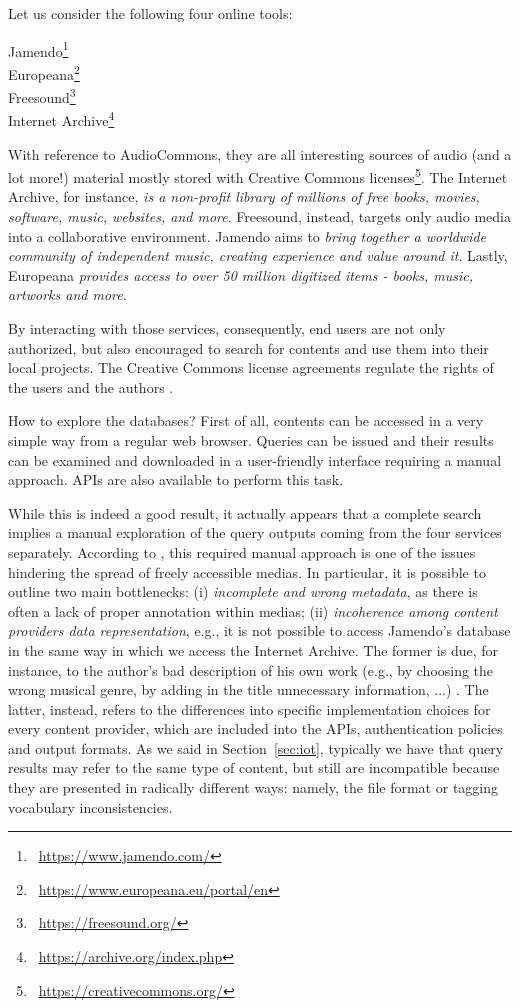 Let us consider the following four online tools:
\begin{multicols}{2}
\begin{center}
Jamendo\footnote{\faLink~\url{https://www.jamendo.com/}} \\
Europeana\footnote{\faLink~\url{https://www.europeana.eu/portal/en}} \\
Freesound\footnote{\faLink~\url{https://freesound.org/}} \\
Internet Archive\footnote{\faLink~\url{https://archive.org/index.php}}
\end{center}
\end{multicols}
With reference to AudioCommons, they are all interesting sources of audio (and a lot more!) material mostly stored with Creative Commons licenses\footnote{\faLink~\url{https://creativecommons.org/}}. The Internet Archive, for instance, \textit{is a non-profit library of millions of free books, movies, software, music, websites, and more}. Freesound, instead, targets only audio media into a collaborative environment. Jamendo aims to \textit{bring together a worldwide community of independent music, creating experience and value around it}. Lastly, Europeana \textit{provides access to over 50 million digitized items - books, music, artworks and more}.

By interacting with those services, consequently, end users are not only authorized, but also encouraged to search for contents and use them into their local projects. The Creative Commons license agreements regulate the rights of the users and the authors \cite{font2016audio}.

How to explore the databases? First of all, contents can be accessed in a very simple way from a regular web browser. Queries can be issued and their results can be examined and downloaded in a user-friendly interface requiring a manual approach. APIs are also available to perform this task.

While this is indeed a good result, it actually appears that a complete search implies a manual exploration of the query outputs coming from the four services separately. According to \cite{font2016audio}, this required manual approach is one of the issues hindering the spread of freely accessible medias. In particular, it is possible to outline two main bottlenecks: (i) \textit{incomplete and wrong metadata}, as there is often a lack of proper annotation within medias; (ii) \textit{incoherence among content providers data representation}, e.g., it is not possible to access Jamendo's database in the same way in which we access the Internet Archive. The former is due, for instance, to the author's bad description of his own work (e.g., by choosing the wrong musical genre, by adding in the title unnecessary information, ...) \cite{favory2018facilitating}. The latter, instead, refers to the differences into specific implementation choices for every content provider, which are included into the APIs, authentication policies and output formats. As we said in Section~\ref{sec:iot}, typically we have that query results may refer to the same type of content, but still are incompatible because they are presented in radically different ways: namely, the file format or tagging vocabulary inconsistencies.

